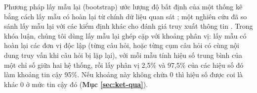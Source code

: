 Phương pháp lấy mẫu lại (bootstrap) ước lượng độ bất định của một thống kê bằng cách lấy mẫu có hoàn lại từ chính dữ liệu quan sát \cite{efron1993bootstrap}; một nghiên cứu đã so sánh lấy mẫu lại với các kiểm định khác cho đánh giá truy xuất thông tin \cite{smucker2007comparison}. Trong khóa luận, chúng tôi dùng lấy mẫu lại ghép cặp với khoảng phân vị: lấy mẫu có hoàn lại các đơn vị độc lập (từng câu hỏi, hoặc từng cụm câu hỏi có cùng nội dung truy vấn khi câu hỏi bị lặp lại), với mỗi mẫu tính hiệu số trung bình của một chỉ số giữa hai hệ thống, rồi lấy phân vị 2,5\% và 97,5\% của các hiệu số đó làm khoảng tin cậy 95\%. Nếu khoảng này không chứa 0 thì hiệu số được coi là khác 0 ở mức tin cậy đó (\textbf{Mục \ref{sec:ket-qua}}).
